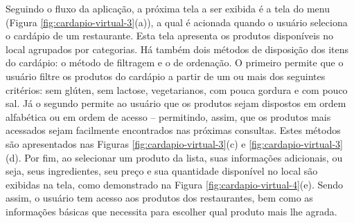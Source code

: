 Seguindo o fluxo da aplicação, a próxima tela a ser exibida é a tela do menu (Figura \ref{fig:cardapio-virtual-3}(a)), a qual é acionada quando o usuário seleciona o cardápio de um restaurante. Esta tela apresenta os produtos disponíveis no local agrupados por categorias. Há também dois métodos de disposição dos itens do cardápio: o método de filtragem e o de ordenação. O primeiro permite que o usuário filtre os produtos do cardápio a partir de um ou mais dos seguintes critérios: sem glúten, sem lactose, vegetarianos, com pouca gordura e com pouco sal. Já o segundo permite ao usuário que os produtos sejam dispostos em ordem alfabética ou em ordem de acesso -- permitindo, assim, que os produtos mais acessados sejam facilmente encontrados nas próximas consultas. Estes métodos são apresentados nas Figuras \ref{fig:cardapio-virtual-3}(c) e \ref{fig:cardapio-virtual-3}(d). Por fim, ao selecionar um produto da lista, suas informações adicionais, ou seja, seus ingredientes, seu preço e sua quantidade disponível no local são exibidas na tela, como demonstrado na Figura \ref{fig:cardapio-virtual-4}(e). Sendo assim, o usuário tem acesso aos produtos dos restaurantes, bem como as informações básicas que necessita para escolher qual produto mais lhe agrada.

